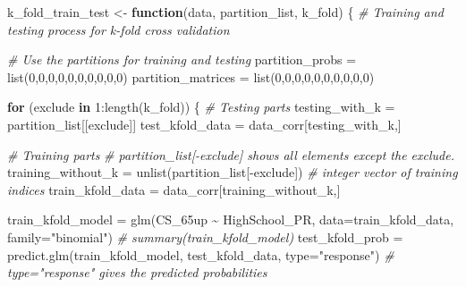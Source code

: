 \documentclass[
]{article}
\newenvironment{Shaded}{\begin{snugshade}}{\end{snugshade}}
\newcommand{\AttributeTok}[1]{\textcolor[rgb]{0.77,0.63,0.00}{#1}}
\newcommand{\CommentTok}[1]{\textcolor[rgb]{0.56,0.35,0.01}{\textit{#1}}}
\newcommand{\ControlFlowTok}[1]{\textcolor[rgb]{0.13,0.29,0.53}{\textbf{#1}}}
\newcommand{\DecValTok}[1]{\textcolor[rgb]{0.00,0.00,0.81}{#1}}
\newcommand{\FunctionTok}[1]{\textcolor[rgb]{0.00,0.00,0.00}{#1}}
\newcommand{\NormalTok}[1]{#1}
\newcommand{\OtherTok}[1]{\textcolor[rgb]{0.56,0.35,0.01}{#1}}
\newcommand{\SpecialCharTok}[1]{\textcolor[rgb]{0.00,0.00,0.00}{#1}}
\newcommand{\StringTok}[1]{\textcolor[rgb]{0.31,0.60,0.02}{#1}}
\begin{document}
\begin{Shaded}
\begin{Highlighting}[]
\NormalTok{k\_fold\_train\_test }\OtherTok{\textless{}{-}} \ControlFlowTok{function}\NormalTok{(data, partition\_list, k\_fold) \{}
  \CommentTok{\# Training and testing process for k{-}fold cross validation}
  
  \CommentTok{\# Use the partitions for training and testing}
\NormalTok{  partition\_probs }\OtherTok{=} \FunctionTok{list}\NormalTok{(}\DecValTok{0}\NormalTok{,}\DecValTok{0}\NormalTok{,}\DecValTok{0}\NormalTok{,}\DecValTok{0}\NormalTok{,}\DecValTok{0}\NormalTok{,}\DecValTok{0}\NormalTok{,}\DecValTok{0}\NormalTok{,}\DecValTok{0}\NormalTok{,}\DecValTok{0}\NormalTok{,}\DecValTok{0}\NormalTok{)}
\NormalTok{  partition\_matrices }\OtherTok{=} \FunctionTok{list}\NormalTok{(}\DecValTok{0}\NormalTok{,}\DecValTok{0}\NormalTok{,}\DecValTok{0}\NormalTok{,}\DecValTok{0}\NormalTok{,}\DecValTok{0}\NormalTok{,}\DecValTok{0}\NormalTok{,}\DecValTok{0}\NormalTok{,}\DecValTok{0}\NormalTok{,}\DecValTok{0}\NormalTok{,}\DecValTok{0}\NormalTok{)}
  
  \ControlFlowTok{for}\NormalTok{ (exclude }\ControlFlowTok{in} \DecValTok{1}\SpecialCharTok{:}\FunctionTok{length}\NormalTok{(k\_fold)) \{}
    \CommentTok{\# Testing parts}
\NormalTok{    testing\_with\_k }\OtherTok{=}\NormalTok{ partition\_list[[exclude]]}
\NormalTok{    test\_kfold\_data }\OtherTok{=}\NormalTok{ data\_corr[testing\_with\_k,]}
    
    \CommentTok{\# Training parts}
    \CommentTok{\# partition\_list[{-}exclude] shows all elements except the exclude.}
\NormalTok{    training\_without\_k }\OtherTok{=} \FunctionTok{unlist}\NormalTok{(partition\_list[}\SpecialCharTok{{-}}\NormalTok{exclude]) }
    \CommentTok{\# integer vector of training indices}
\NormalTok{    train\_kfold\_data }\OtherTok{=}\NormalTok{ data\_corr[training\_without\_k,]}
    
\NormalTok{    train\_kfold\_model }\OtherTok{=} \FunctionTok{glm}\NormalTok{(CS\_65up }\SpecialCharTok{\textasciitilde{}}\NormalTok{ HighSchool\_PR, }
                            \AttributeTok{data=}\NormalTok{train\_kfold\_data, }\AttributeTok{family=}\StringTok{"binomial"}\NormalTok{)}
    \CommentTok{\# summary(train\_kfold\_model)}
\NormalTok{    test\_kfold\_prob }\OtherTok{=} \FunctionTok{predict.glm}\NormalTok{(train\_kfold\_model, }
\NormalTok{                                  test\_kfold\_data, }\AttributeTok{type=}\StringTok{"response"}\NormalTok{)}
    \CommentTok{\# type="response" gives the predicted probabilities}
    

\end{Highlighting}
\end{Shaded}
\end{document}
